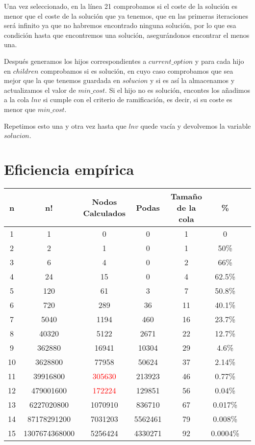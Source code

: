 \documentclass[11pt]{article}
\begin{document}
Una vez seleccionado, en la línea 21 comprobamos si el coste de la solución es menor que el coste de la solución que ya tenemos, que en las primeras iteraciones será infinito ya que no habremos encontrado ninguna solución, por lo que esa condición hasta que encontremos una solución, asegurándonos encontrar el menos una.

Después generamos los hijos correspondientes a $current\_option$ y para cada hijo en $children$ comprobamos si es solución, en cuyo caso comprobamos que sea mejor que la que tenemos guardada en $solucion$ y si es así la almacenamos y actualizamos el valor de $min\_cost$. Si el hijo no es solución, encontes los añadimos a la cola $lnv$ si cumple con el criterio de ramificación, es decir, si su coste es menor que $min\_cost$.

Repetimos esto una y otra vez hasta que $lnv$ quede vacía y devolvemos la variable $solucion$.
\newpage
\section{Eficiencia empírica}

\begin{table}[hb]
\begin{center}

\begin{tabular}{|c|c|c|c|c|c|c|}
\hline
n & n! & Nodos Calculados & Podas & Tamaño de la cola & \% \\
\hline
1 & 1  &0& 0     & 1                 & 0 \\
2 & 2  &1& 0     & 1                 & 50\% \\
3 & 6  &4& 0     & 2                 & 66\% \\
4 & 24  &15& 0     & 4                 & 62.5\% \\
5 & 120  &61& 3     & 7                 & 50.8\% \\
6 & 720  &289& 36     & 11                 & 40.1\% \\
7 & 5040  &1194& 460     & 16                 & 23.7\% \\
8 & 40320  &5122& 2671     & 22                 & 12.7\% \\
9 & 362880  &16941& 10304     & 29                 & 4.6\% \\
10 &3628800&77958& 50624     & 37                 & 2.14\% \\
11 &39916800&\textcolor{red}{305630}& 213923     & 46                 & 0.77\% \\
12 &479001600&\textcolor{red}{172224}& 129851     & 56                 & 0.04\% \\
13 &6227020800&1070910& 836710     & 67                 & 0.017\% \\
14 &87178291200&7031203& 5562461     & 79                 & 0.008\% \\
15 &1307674368000&5256424& 4330271     & 92                 & 0.0004\% \\
\hline

\end{tabular}
\end{center}

\end{table}
\end{document}
